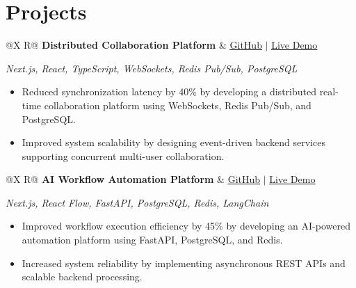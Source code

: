 \documentclass[a4paper,10pt]{article}
\newcommand{\ulink}[2]{\href{#1}{\uline{#2}}}
\newcommand{\subheading}[1]{{\color[HTML]{0A0A0A}\fontsize{12}{14}\selectfont\bfseries #1}}
\newcommand{\techstack}[1]{{\color[HTML]{5C5C5C}\fontsize{10.5}{12.5}\selectfont\itshape #1}}
\newcommand{\meta}[1]{{\color[HTML]{5C5C5C}\fontsize{10.5}{12.5}\selectfont #1}}
\begin{document}
\vspace{4pt}

\section{Projects}
\vspace{3pt}

\begin{tabularx}{\linewidth}{@{}X R@{}}
  \subheading{Distributed Collaboration Platform} &
  \meta{\ulink{https://github.com/su-jin1425/distributed-collaboration-platform}{GitHub} $|$ \ulink{https://distributed-collaboration-platform.vercel.app}{Live Demo}}
\end{tabularx}
\vspace{1pt}
\techstack{Next.js, React, TypeScript, WebSockets, Redis Pub/Sub, PostgreSQL}
\begin{itemize}[nosep, leftmargin=1.5em, itemsep=2pt, topsep=3pt]
  \item {\color[HTML]{0A0A0A}\fontsize{11}{15}\selectfont Reduced synchronization latency by 40\% by developing a distributed real-time collaboration platform using WebSockets, Redis Pub/Sub, and PostgreSQL.}
  \item {\color[HTML]{0A0A0A}\fontsize{11}{15}\selectfont Improved system scalability by designing event-driven backend services supporting concurrent multi-user collaboration.}
\end{itemize}

\vspace{6pt}

\begin{tabularx}{\linewidth}{@{}X R@{}}
  \subheading{AI Workflow Automation Platform} &
  \meta{\ulink{https://github.com/su-jin1425/ai-workflow-automation-platform}{GitHub} $|$ \ulink{https://ai-workflow-automation-platform.vercel.app}{Live Demo}}
\end{tabularx}
\vspace{1pt}
\techstack{Next.js, React Flow, FastAPI, PostgreSQL, Redis, LangChain}
\begin{itemize}[nosep, leftmargin=1.5em, itemsep=2pt, topsep=3pt]
  \item {\color[HTML]{0A0A0A}\fontsize{11}{15}\selectfont Improved workflow execution efficiency by 45\% by developing an AI-powered automation platform using FastAPI, PostgreSQL, and Redis.}
  \item {\color[HTML]{0A0A0A}\fontsize{11}{15}\selectfont Increased system reliability by implementing asynchronous REST APIs and scalable backend processing.}
\end{itemize}
\end{document}
